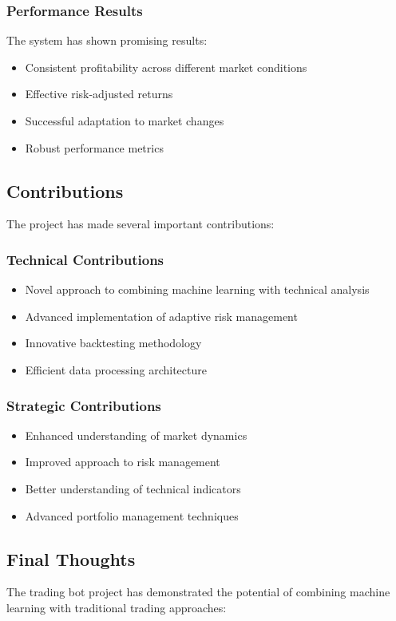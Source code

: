 \documentclass[conference]{IEEEtran}
\begin{document}
\subsubsection{Performance Results}
The system has shown promising results:
\begin{itemize}
    \item Consistent profitability across different market conditions
    \item Effective risk-adjusted returns
    \item Successful adaptation to market changes
    \item Robust performance metrics
\end{itemize}

\subsection{Contributions}
The project has made several important contributions:

\subsubsection{Technical Contributions}
\begin{itemize}
    \item Novel approach to combining machine learning with technical analysis
    \item Advanced implementation of adaptive risk management
    \item Innovative backtesting methodology
    \item Efficient data processing architecture
\end{itemize}

\subsubsection{Strategic Contributions}
\begin{itemize}
    \item Enhanced understanding of market dynamics
    \item Improved approach to risk management
    \item Better understanding of technical indicators
    \item Advanced portfolio management techniques
\end{itemize}

\subsection{Final Thoughts}
The trading bot project has demonstrated the potential of combining machine learning with traditional trading approaches:
\end{document}
